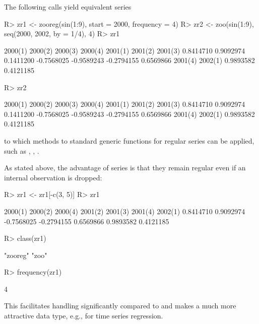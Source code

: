 \documentclass[article,nojss]{jss}
\begin{document}
The following calls yield equivalent series

\begin{Schunk}
\begin{Sinput}
R> zr1 <- zooreg(sin(1:9), start = 2000, frequency = 4)
R> zr2 <- zoo(sin(1:9), seq(2000, 2002, by = 1/4), 4)
R> zr1
\end{Sinput}
\begin{Soutput}
   2000(1)    2000(2)    2000(3)    2000(4)    2001(1)    2001(2)    2001(3) 
 0.8414710  0.9092974  0.1411200 -0.7568025 -0.9589243 -0.2794155  0.6569866 
   2001(4)    2002(1) 
 0.9893582  0.4121185 
\end{Soutput}
\begin{Sinput}
R> zr2
\end{Sinput}
\begin{Soutput}
   2000(1)    2000(2)    2000(3)    2000(4)    2001(1)    2001(2)    2001(3) 
 0.8414710  0.9092974  0.1411200 -0.7568025 -0.9589243 -0.2794155  0.6569866 
   2001(4)    2002(1) 
 0.9893582  0.4121185 
\end{Soutput}
\end{Schunk}

to which methods to standard generic functions for regular series can be
applied, such as , , .

As stated above, the advantage of  series is that they remain
regular even if an internal observation is dropped:

\begin{Schunk}
\begin{Sinput}
R> zr1 <- zr1[-c(3, 5)]
R> zr1
\end{Sinput}
\begin{Soutput}
   2000(1)    2000(2)    2000(4)    2001(2)    2001(3)    2001(4)    2002(1) 
 0.8414710  0.9092974 -0.7568025 -0.2794155  0.6569866  0.9893582  0.4121185 
\end{Soutput}
\begin{Sinput}
R> class(zr1)
\end{Sinput}
\begin{Soutput}
[1] "zooreg" "zoo"   
\end{Soutput}
\begin{Sinput}
R> frequency(zr1)
\end{Sinput}
\begin{Soutput}
[1] 4
\end{Soutput}
\end{Schunk}

This facilitates  handling significantly compared to  and makes
 a much more attractive data type, e.g., for time series regression.
\end{document}
